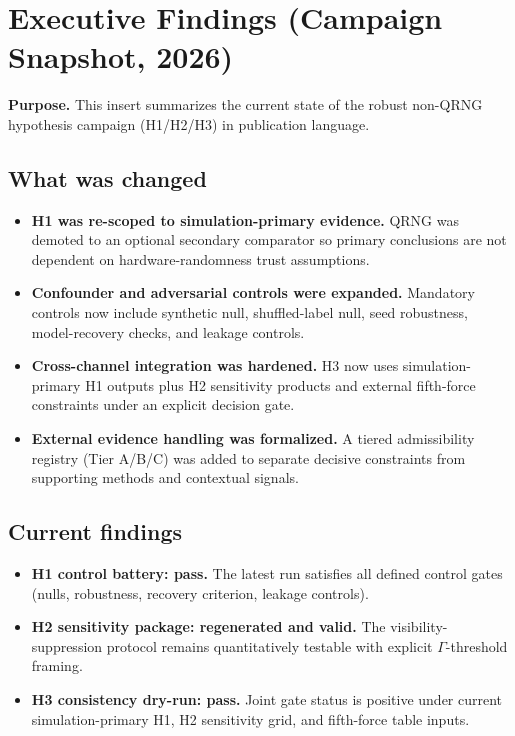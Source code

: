 \section*{Executive Findings (Campaign Snapshot, 2026)}

\textbf{Purpose.} This insert summarizes the current state of the robust non-QRNG hypothesis campaign (H1/H2/H3) in publication language.

\subsection*{What was changed}
\begin{itemize}
    \item \textbf{H1 was re-scoped to simulation-primary evidence.} QRNG was demoted to an optional secondary comparator so primary conclusions are not dependent on hardware-randomness trust assumptions.
    \item \textbf{Confounder and adversarial controls were expanded.} Mandatory controls now include synthetic null, shuffled-label null, seed robustness, model-recovery checks, and leakage controls.
    \item \textbf{Cross-channel integration was hardened.} H3 now uses simulation-primary H1 outputs plus H2 sensitivity products and external fifth-force constraints under an explicit decision gate.
    \item \textbf{External evidence handling was formalized.} A tiered admissibility registry (Tier A/B/C) was added to separate decisive constraints from supporting methods and contextual signals.
\end{itemize}

\subsection*{Current findings}
\begin{itemize}
    \item \textbf{H1 control battery: pass.} The latest run satisfies all defined control gates (nulls, robustness, recovery criterion, leakage controls).
    \item \textbf{H2 sensitivity package: regenerated and valid.} The visibility-suppression protocol remains quantitatively testable with explicit \(\Gamma\)-threshold framing.
    \item \textbf{H3 consistency dry-run: pass.} Joint gate status is positive under current simulation-primary H1, H2 sensitivity grid, and fifth-force table inputs.
\end{itemize}

